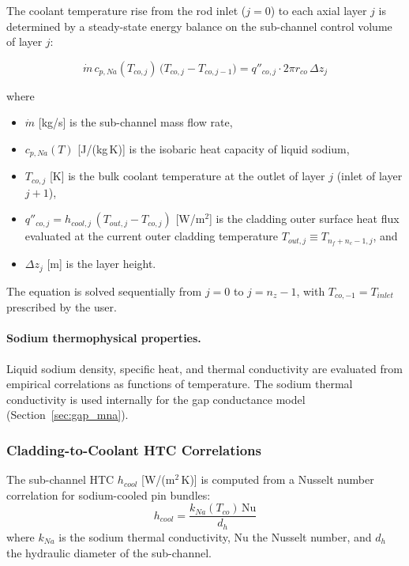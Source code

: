 \begin{refsection}
The coolant temperature rise from the rod inlet ($j=0$) to each axial layer $j$ is determined by a steady-state energy balance on the sub-channel control volume of layer $j$:

\begin{equation}
  \dot{m}\,c_{p,Na}(T_{co,j})\,\bigl(T_{co,j} - T_{co,j-1}\bigr)
  = q''_{co,j}\cdot 2\pi r_{co}\,\Delta z_j
  \label{eq:subchannel_energy}
\end{equation}

where
\begin{itemize}
\item $\dot{m}$ [kg/s] is the sub-channel mass flow rate,
\item $c_{p,Na}(T)$ [J/(kg\,K)] is the isobaric heat capacity of liquid sodium,
\item $T_{co,j}$ [K] is the bulk coolant temperature at the outlet of layer $j$ (inlet of layer $j+1$),
\item $q''_{co,j} = h_{cool,j}\,(T_{out,j} - T_{co,j})$ [W/m$^2$] is the cladding outer surface heat flux evaluated at the current outer cladding temperature $T_{out,j} \equiv T_{n_f+n_c-1,j}$, and
\item $\Delta z_j$ [m] is the layer height.
\end{itemize}

The equation is solved sequentially from $j=0$ to $j=n_z-1$, with $T_{co,-1} = T_{inlet}$ prescribed by the user.

\paragraph{Sodium thermophysical properties.} Liquid sodium density, specific heat, and thermal conductivity are evaluated from empirical correlations as functions of temperature. The sodium thermal conductivity is used internally for the gap conductance model (Section~\ref{sec:gap_mna}).

\subsubsection{Cladding-to-Coolant HTC Correlations}

The sub-channel HTC $h_{cool}$ [W/(m$^2$\,K)] is computed from a Nusselt number correlation for sodium-cooled pin bundles:
\begin{equation}
  h_{cool} = \frac{k_{Na}(T_{co})\,\mathrm{Nu}}{d_h}
  \label{eq:htc_def}
\end{equation}
where $k_{Na}$ is the sodium thermal conductivity, $\mathrm{Nu}$ the Nusselt number, and $d_h$ the hydraulic diameter of the sub-channel.


\end{refsection}
